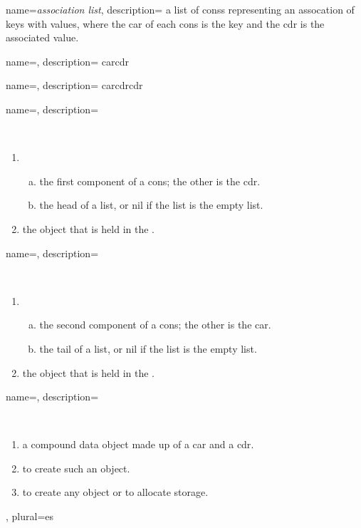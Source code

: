 {
  name={\sl association list},
  description={%
    a \gls{list} of \glspl{cons} representing an assocation of keys with values,
    where the \gls{car} of each \gls{cons} is the key and the \gls{cdr} is the
    associated value.
  }
}


{
  name={},
  description={%
    \gls{car}\lsp{ (}\gls{cdr}
  }
}

{
  name={},
  description={%
    \gls{car}\lsp{ (}\gls{cdr}\lsp{ (}\gls{cdr}
  }
}


{
  name={},
  description={\ \\
    \begin{enumerate}
    \item \ \\
      \begin{enumerate}[a.]
      \item the first component of a \gls{cons}; the other is the \gls{cdr}.
      \item the head of a \gls{list}, or \gls{nil} if the list is the \gls{empty
          list}.
      \end{enumerate}
    \item the \gls{object} that is held in the . 
    \end{enumerate}
  }
}

{
  name={},
  description={\ \\
    \begin{enumerate}
    \item \ \\
      \begin{enumerate}[a.]
      \item the second component of a \gls{cons}; the other is the \gls{car}.
      \item the tail of a \gls{list}, or \gls{nil} if the list is the \gls{empty
          list}.
      \end{enumerate}
    \item the \gls{object} that is held in the . 
    \end{enumerate}
  }
}


{
  name={},
  description={\ \\
    \begin{enumerate}
    \item a compound data \gls{object} made up of a \gls{car} and a \gls{cdr}.
    \item to create such an \gls{object}.
    \item to create any \gls{object} or to allocate storage.
    \end{enumerate}
  },
  plural={es}
}


